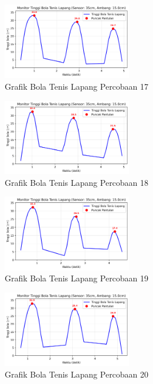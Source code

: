 \begin{figure}[htbp]
    \centering
    \includegraphics[width=0.5\textwidth]{chapters/DataPercobaan/Grafik_Bola_Tenis_Lapang_17.png}
    \caption{Grafik Bola Tenis Lapang Percobaan 17}
\end{figure}
\begin{figure}[htbp]
    \centering
    \includegraphics[width=0.5\textwidth]{chapters/DataPercobaan/Grafik_Bola_Tenis_Lapang_18.png}
    \caption{Grafik Bola Tenis Lapang Percobaan 18}
\end{figure}
\begin{figure}[htbp]
    \centering
    \includegraphics[width=0.5\textwidth]{chapters/DataPercobaan/Grafik_Bola_Tenis_Lapang_19.png}
    \caption{Grafik Bola Tenis Lapang Percobaan 19}
\end{figure}
\begin{figure}[htbp]
    \centering
    \includegraphics[width=0.5\textwidth]{chapters/DataPercobaan/Grafik_Bola_Tenis_Lapang_20.png}
    \caption{Grafik Bola Tenis Lapang Percobaan 20}
\end{figure}

